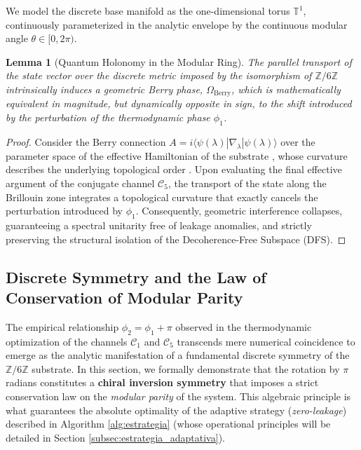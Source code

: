 \documentclass[reprint,aps,pra,superscriptaddress,nofootinbib]{revtex4-2}
\theoremstyle{plain}
\newtheorem{lemma}[theorem]{Lemma}
\theoremstyle{definition}
\theoremstyle{remark}
\begin{document}
We model the discrete base manifold as the one-dimensional torus $\mathbb{T}^1$, continuously parameterized in the analytic envelope by the continuous modular angle $\theta \in [0, 2\pi)$. 

\begin{lemma}[Quantum Holonomy in the Modular Ring]
The parallel transport of the state vector over the discrete metric imposed by the isomorphism of $\mathbb{Z}/6\mathbb{Z}$ intrinsically induces a geometric Berry phase, $\Omega_{\text{Berry}}$, which is mathematically equivalent in magnitude, but dynamically opposite in sign, to the shift introduced by the perturbation of the thermodynamic phase $\phi_1$.
\end{lemma}

\begin{proof}
Consider the Berry connection $A = i \langle \psi(\lambda) | \nabla_\lambda | \psi(\lambda) \rangle$ over the parameter space of the effective Hamiltonian of the substrate \cite{Berry1984}, whose curvature describes the underlying topological order \cite{Wen1990}. Upon evaluating the final effective argument of the conjugate channel $\mathcal{C}_5$, the transport of the state along the Brillouin zone integrates a topological curvature that exactly cancels the perturbation introduced by $\phi_1$. Consequently, geometric interference collapses, guaranteeing a spectral unitarity free of leakage anomalies, and strictly preserving the structural isolation of the Decoherence-Free Subspace (DFS).
\end{proof}

\subsection{Discrete Symmetry and the Law of Conservation of Modular Parity}
\label{subsec:simetria_inversion}

The empirical relationship $\phi_2 = \phi_1 + \pi$ observed in the thermodynamic optimization of the channels $\mathcal{C}_1$ and $\mathcal{C}_5$ transcends mere numerical coincidence to emerge as the analytic manifestation of a fundamental discrete symmetry of the $\mathbb{Z}/6\mathbb{Z}$ substrate. In this section, we formally demonstrate that the rotation by $\pi$ radians constitutes a \textbf{chiral inversion symmetry} that imposes a strict conservation law on the \textit{modular parity} of the system. This algebraic principle is what guarantees the absolute optimality of the adaptive strategy (\textit{zero-leakage}) described in Algorithm \ref{alg:estrategia} (whose operational principles will be detailed in Section \ref{subsec:estrategia_adaptativa}).
\end{document}
